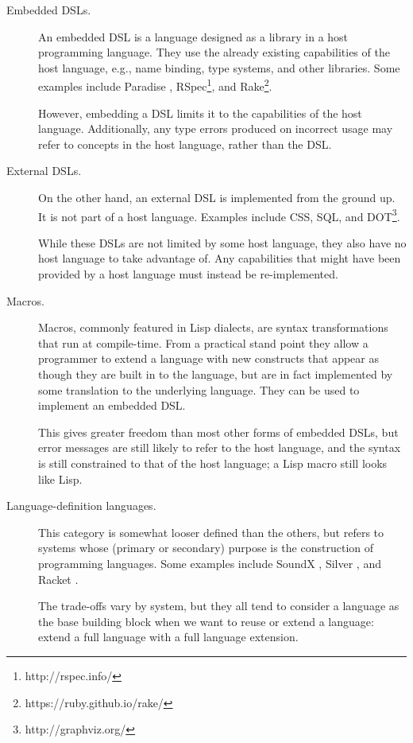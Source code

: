 \documentclass{kththesis}
\begin{document}
\begin{description}
  \item[Embedded DSLs.] An embedded DSL is a language designed as a library in a host programming language. They use the already existing capabilities of the host language, e.g., name binding, type systems, and other libraries. Some examples include Paradise \cite{Augustsson2008Paradise:-A-Two}, RSpec\footnote{http://rspec.info/}, and Rake\footnote{https://ruby.github.io/rake/}.

  However, embedding a DSL limits it to the capabilities of the host language. Additionally, any type errors produced on incorrect usage may refer to concepts in the host language, rather than the DSL.

  \item[External DSLs.] On the other hand, an external DSL is implemented from the ground up. It is not part of a host language. Examples include CSS, SQL, and DOT\footnote{http://graphviz.org/}.

  While these DSLs are not limited by some host language, they also have no host language to take advantage of. Any capabilities that might have been provided by a host language must instead be re-implemented.

  \item[Macros.] Macros, commonly featured in Lisp dialects, are syntax transformations that run at compile-time. From a practical stand point they allow a programmer to extend a language with new constructs that appear as though they are built in to the language, but are in fact implemented by some translation to the underlying language. They can be used to implement an embedded DSL.

  This gives greater freedom than most other forms of embedded DSLs, but error messages are still likely to refer to the host language, and the syntax is still constrained to that of the host language; a Lisp macro still looks like Lisp.

  \item[Language-definition languages.] This category is somewhat looser defined than the others, but refers to systems whose (primary or secondary) purpose is the construction of programming languages. Some examples include SoundX \cite{Lorenzen2016Sound-type-depe}, Silver \cite{Van-Wyk2010Silver:-An-exte}, and Racket \cite{Tobin-Hochstadt:2011:LL:1993498.1993514}.

  The trade-offs vary by system, but they all tend to consider a language as the base building block when we want to reuse or extend a language: extend a full language with a full language extension.
\end{description}
\end{document}

